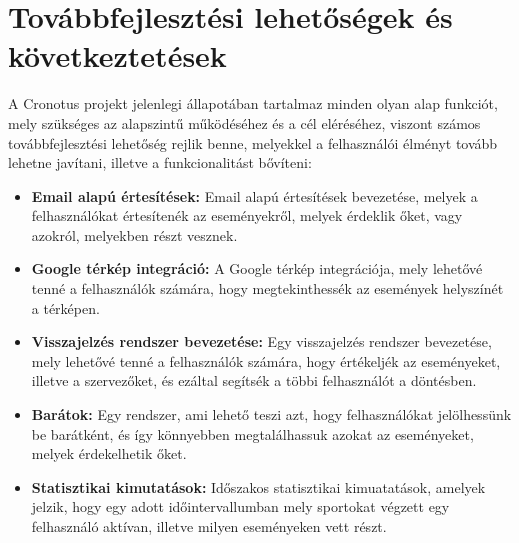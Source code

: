 \chapter*{Továbbfejlesztési lehetőségek és következtetések} \label{fejezet4}
\onehalfspacing
A Cronotus projekt jelenlegi állapotában tartalmaz minden olyan alap funkciót, mely szükséges az alapszintű működéséhez
és a cél eléréséhez, viszont számos továbbfejlesztési lehetőség rejlik benne, melyekkel a felhasználói élményt tovább
lehetne javítani, illetve a funkcionalitást bővíteni:

\begin{itemize}
	\item \textbf{Email alapú értesítések:} Email alapú értesítések bevezetése, melyek a felhasználókat értesítenék az eseményekről, melyek érdeklik őket, vagy azokról, melyekben részt vesznek.
	
	\item \textbf{Google térkép integráció:} A Google térkép integrációja, mely lehetővé tenné a felhasználók számára, hogy megtekinthessék az események helyszínét a térképen.
	
	\item \textbf{Visszajelzés rendszer bevezetése:} Egy visszajelzés rendszer bevezetése, mely lehetővé tenné a felhasználók számára, hogy értékeljék az eseményeket, illetve a szervezőket, és ezáltal segítsék a többi felhasználót a döntésben.
	
	\item \textbf{Barátok:} Egy rendszer, ami lehető teszi azt, hogy felhasználókat jelölhessünk be barátként, és így könnyebben megtalálhassuk azokat az eseményeket, melyek érdekelhetik őket.
	
	\item \textbf{Statisztikai kimutatások:} Időszakos statisztikai kimuatatások, amelyek jelzik, hogy egy adott időintervallumban mely sportokat végzett egy felhasználó aktívan, illetve milyen eseményeken vett részt.
\end{itemize}

